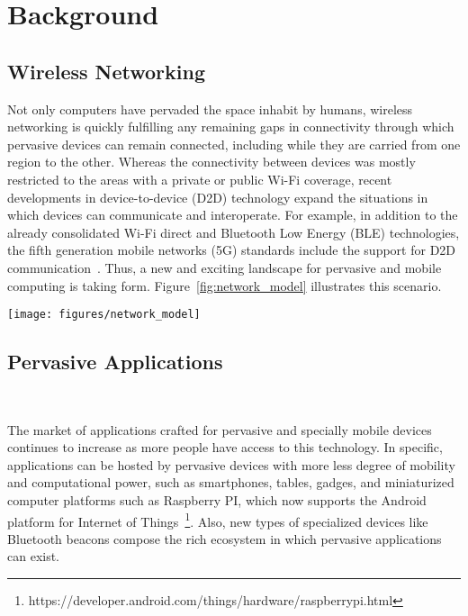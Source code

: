 \section{Background}\label{sec:background}


\subsection{Wireless Networking}

Not only computers have pervaded the space inhabit by humans, wireless networking is quickly fulfilling any remaining gaps in connectivity through which pervasive devices can remain connected, including while they are carried from one region to the other. Whereas the connectivity between devices was mostly restricted to the areas with a private or public Wi-Fi coverage, recent developments in device-to-device (D2D) technology expand the situations in which devices can communicate and interoperate. For example, in addition to the already consolidated Wi-Fi direct and Bluetooth Low Energy (BLE) technologies, the fifth generation mobile networks (5G) standards include the support for D2D communication~\cite{Tehrani:2014}. Thus, a new and exciting landscape for pervasive and mobile computing is taking form. Figure~\ref{fig:network_model} illustrates this scenario.

\begin{figure*}[t!]
	\centering
	\texttt{[image: figures/network\_model]}
	\caption{Application nodes communicating through Wi-Fi or D2D technologies}
	\label{fig:network_model}
\end{figure*}

\subsection{Pervasive Applications}~\label{sec:characterization}

The market of applications crafted for pervasive and specially mobile devices continues to increase as more people have access to this technology. In specific, applications can be hosted by pervasive devices with more less degree of mobility and computational power, such as smartphones, tables, gadges, and miniaturized computer platforms such as Raspberry PI, which now supports the Android platform for Internet of Things~\footnote{https://developer.android.com/things/hardware/raspberrypi.html}. Also, new types of specialized devices like Bluetooth beacons compose the rich ecosystem in which pervasive applications can exist.

